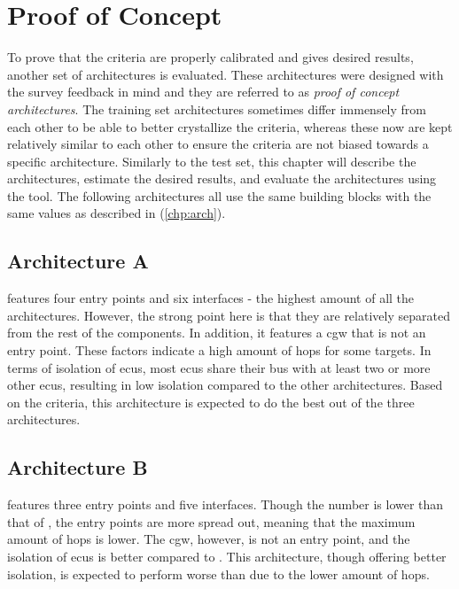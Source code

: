 \chapter{Proof of Concept}
\label{chp:compeval}

To prove that the criteria are properly calibrated and gives desired results, another set of architectures is evaluated.
These architectures were designed with the survey feedback in mind and they are referred to as \textit{proof of concept architectures}.
The training set architectures sometimes differ immensely from each other to be able to better crystallize the criteria,
whereas these now are kept relatively similar to each other to ensure the criteria are not biased towards a specific architecture.
Similarly to the test set, this chapter will describe the architectures, estimate the desired results, and evaluate the architectures using the tool.
The following architectures all use the same building blocks with the same values as described in (\ref{chp:arch}).

\section{Architecture A}
\label{sec:archa}

 features four entry points and six interfaces - the highest amount of all the architectures.
However, the strong point here is that they are relatively separated from the rest of the components.
In addition, it features a \acrshort{cgw} that is not an entry point.
These factors indicate a high amount of hops for some targets.
In terms of isolation of \acrshort{ecu}s, most \acrshort{ecu}s share their bus with at least two or 
more other \acrshort{ecu}s, resulting in low isolation compared to the other architectures.
Based on the criteria, this architecture is expected to do the best out of the three architectures.

\section{Architecture B}
\label{sec:archb}

 features three entry points and five interfaces.
Though the number is lower than that of , the entry points are more spread out, meaning that the maximum amount of hops is lower.
The \acrshort{cgw}, however, is not an entry point, and the isolation of \acrshort{ecu}s is better compared to .
This architecture, though offering better isolation, is expected to perform worse than  due to the lower amount of hops.


